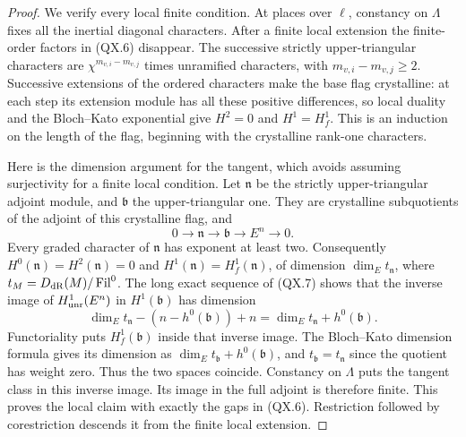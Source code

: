 \begin{proof}
We verify every local finite condition.  At places over $\ell$,
constancy on $\Lambda$ fixes all the inertial diagonal characters.
After a finite local extension the finite-order factors in
(QX.6) disappear.  The successive strictly upper-triangular
characters are $\chi^{m_{v,i}-m_{v,j}}$ times unramified
characters, with $m_{v,i}-m_{v,j}\ge2$.  Successive extensions of
the ordered characters make the base flag crystalline: at each
step its extension module has all these positive differences,
so local duality and the Bloch--Kato exponential give
$H^2=0$ and $H^1=H^1_f$.  This is an induction on the length of
the flag, beginning with the crystalline rank-one characters.

Here is the dimension argument for the tangent, which avoids
assuming surjectivity for a finite local condition.  Let
$\mathfrak n$ be the strictly upper-triangular adjoint module,
and $\mathfrak b$ the upper-triangular one.  They are crystalline
subquotients of the adjoint of this crystalline flag, and
\[
 0\longrightarrow\mathfrak n\longrightarrow\mathfrak b
       \longrightarrow E^n\longrightarrow0.
 \tag{QX.7}
\]
Every graded character of $\mathfrak n$ has exponent at least
two.  Consequently $H^0(\mathfrak n)=H^2(\mathfrak n)=0$ and
$H^1(\mathfrak n)=H^1_f(\mathfrak n)$, of dimension
$\dim_E t_{\mathfrak n}$, where
$t_M=D_{\rm dR}(M)/\operatorname{Fil}^0$.
The long exact sequence of (QX.7) shows that the inverse image
of $H^1_{\rm unr}(E^n)$ in $H^1(\mathfrak b)$ has dimension
\[
 \dim_E t_{\mathfrak n}
       -(n-h^0(\mathfrak b))+n
       =\dim_E t_{\mathfrak n}+h^0(\mathfrak b).
 \tag{QX.8}
\]
Functoriality puts $H^1_f(\mathfrak b)$ inside that inverse
image.  The Bloch--Kato dimension formula gives its dimension
as $\dim_E t_{\mathfrak b}+h^0(\mathfrak b)$, and
$t_{\mathfrak b}=t_{\mathfrak n}$ since the quotient has weight
zero.  Thus the two spaces coincide.  Constancy on $\Lambda$
puts the tangent class in this inverse image.  Its image in
the full adjoint is therefore finite.  This proves the local
claim with exactly the gaps in (QX.6).  Restriction followed by
corestriction descends it from the finite local extension.


\end{proof}
